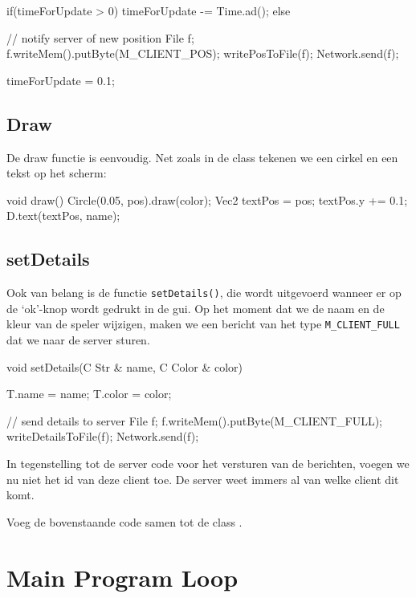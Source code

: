 \begin{code}
if(timeForUpdate > 0)
{
	 timeForUpdate -= Time.ad();
} else {
	 // notify server of new position
	 File f;
	 f.writeMem().putByte(M_CLIENT_POS);
	 writePosToFile(f);
	 Network.send(f);
	 
	 timeForUpdate = 0.1;
}
\end{code}

\subsection{Draw}
De draw functie is eenvoudig. Net zoals in de  class tekenen we een cirkel en een tekst op het scherm:

\begin{code}
void draw()
{
	Circle(0.05, pos).draw(color);
	Vec2 textPos = pos;
	textPos.y += 0.1;
	D.text(textPos, name);
}
\end{code}

\subsection{setDetails}

Ook van belang is de functie \texttt{setDetails()}, die wordt uitgevoerd wanneer er op de `ok'-knop wordt gedrukt in de gui. Op het moment dat we de naam en de kleur van de speler wijzigen, maken we een bericht van het type \texttt{M\_CLIENT\_FULL} dat we naar de server sturen.

\begin{code}
void setDetails(C Str & name, C Color & color)
{
	T.name = name;
	T.color = color;
	
	// send details to server
	File f;
	f.writeMem().putByte(M_CLIENT_FULL);
	writeDetailsToFile(f);
	Network.send(f);
}
\end{code}

\begin{note}
In tegenstelling tot de server code voor het versturen van de berichten, voegen we nu niet het id van deze client toe. De server weet immers al van welke client dit komt.
\end{note}

\begin{exercise}
Voeg de bovenstaande code samen tot de class .
\end{exercise}

\section{Main Program Loop}

